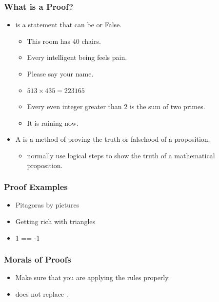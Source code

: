 \documentclass{beamer}
\begin{document}
\begin{frame}
  \frametitle{What is a Proof?}

  \begin{itemize}
  \item {} is a statement that can be
     or \alert{False}.
    \begin{itemize}
    \item This room has 40 chairs.
    \item Every intelligent being feels pain.
    \item Please say your name.
    \item $513 \times 435 = 223165$
    \item Every even integer greater than 2 is the sum of two primes.
    \item It is raining now.
    \end{itemize}

    \bigskip

  \item A  is a method of proving the truth or falsehood of a proposition.
    \begin{itemize}
    \item {} normally use logical steps
      to show the truth of a mathematical proposition.
    \end{itemize}
  \end{itemize}
  
\end{frame}

\begin{frame}
  \frametitle{Proof Examples}
  \begin{itemize}
  \item Pitagoras by pictures
  \item Getting rich with triangles
  \item 1 == -1
  \end{itemize}
\end{frame}

\begin{frame}
  \frametitle{Morals of Proofs}
  \begin{itemize}
  \item Make sure that you are applying the rules properly.
  \item {} does not replace .
  \end{itemize}
\end{frame}
\end{document}
